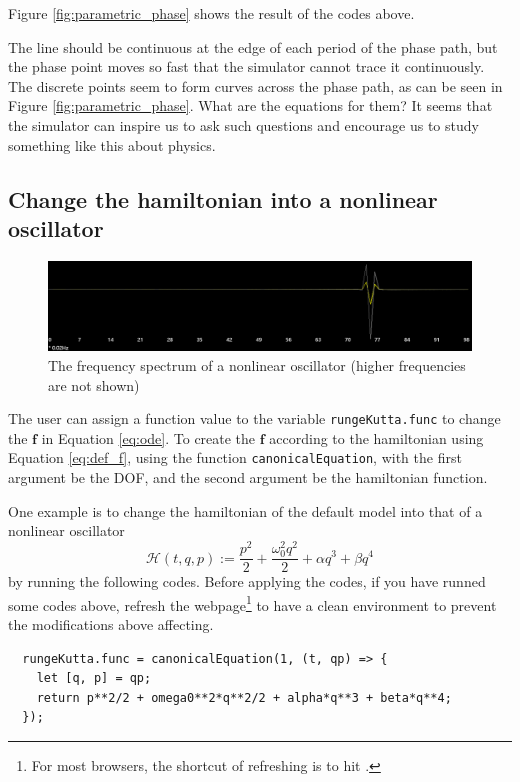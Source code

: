 \documentclass[12pt]{article}
\begin{document}
Figure \ref{fig:parametric_phase} shows the result of the codes above.

The line should be continuous at the edge of each period of the phase path,
but the phase point moves so fast that the simulator cannot trace it continuously.
The discrete points seem to form curves across the phase path,
as can be seen in Figure \ref{fig:parametric_phase}.
What are the equations for them?
It seems that the simulator can inspire us to ask such questions
and encourage us to study something like this about physics.

\subsection{Change the hamiltonian into a nonlinear oscillator}

\begin{figure}
  \centering
  \includegraphics[width=0.9\linewidth]{nonlinear_frequency.png}
  \caption{The frequency spectrum of a nonlinear oscillator (higher frequencies are not shown)}
  \label{fig:nonlinear}
\end{figure}

The user can assign a function value to the variable \texttt{rungeKutta.func}
to change the $\mathbf f$ in Equation \ref{eq:ode}.
To create the $\mathbf f$ according to the hamiltonian using Equation \ref{eq:def_f},
using the function \texttt{canonicalEquation},
with the first argument be the DOF, and the second argument be the hamiltonian function.

One example is to change the hamiltonian of the default model into that of a nonlinear oscillator
\begin{equation*}
  \mathcal H\!\left(t,q,p\right):=\frac{p^2}2+\frac{\omega_0^2q^2}2+\alpha q^3+\beta q^4
\end{equation*}
by running the following codes.
Before applying the codes, if you have runned some codes above,
refresh the webpage\footnote{
  For most browsers, the shortcut of refreshing is to hit .
} to have a clean environment to prevent the modifications above affecting.

\begin{verbatim}
  rungeKutta.func = canonicalEquation(1, (t, qp) => {
    let [q, p] = qp;
    return p**2/2 + omega0**2*q**2/2 + alpha*q**3 + beta*q**4;
  });
\end{verbatim}
\end{document}

